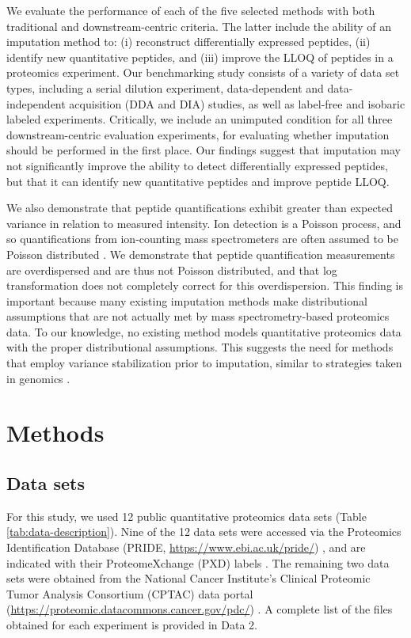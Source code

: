 \documentclass{article}
\begin{document}
We evaluate the performance of each of the five selected methods with both traditional and downstream-centric criteria. The latter include the ability of an imputation method to: (i) reconstruct differentially expressed peptides, (ii) identify new quantitative peptides, and (iii) improve the LLOQ of peptides in a proteomics experiment. Our benchmarking study consists of a variety of data set types, including a serial dilution experiment, data-dependent and data-independent acquisition (DDA and DIA) studies, as well as label-free and isobaric labeled experiments. Critically, we include an unimputed condition for all three downstream-centric evaluation experiments, for evaluating whether imputation should be performed in the first place. Our findings suggest that imputation may not significantly improve the ability to detect differentially expressed peptides, but that it can identify new quantitative peptides and improve peptide LLOQ.

We also demonstrate that peptide quantifications exhibit greater than expected variance in relation to measured intensity. Ion detection is a Poisson process, and so quantifications from ion-counting mass spectrometers are often assumed to be Poisson distributed \cite{ms-dist-derivation, stat-theory-lcms}. We demonstrate that peptide quantification measurements are overdispersed and are thus not Poisson distributed, and that log transformation does not completely correct for this overdispersion. This finding is important because many existing imputation methods make distributional assumptions that are not actually met by mass spectrometry-based proteomics data. To our knowledge, no existing method models quantitative proteomics data with the proper distributional assumptions. This suggests the need for methods that employ variance stabilization prior to imputation, similar to strategies taken in genomics \cite{variance-stable, ZINB, neg-binom-scRNAseq}.

\section{Methods}

\subsection{Data sets}

For this study, we used 12 public quantitative proteomics data sets (Table \ref{tab:data-description}). Nine of the 12 data sets were accessed via the Proteomics Identification Database (PRIDE, \url{https://www.ebi.ac.uk/pride/}) \cite{PRIDE}, and are indicated with their ProteomeXchange (PXD) labels \cite{ProteomeXchange}. The remaining two data sets were obtained from the National Cancer Institute's Clinical Proteomic Tumor Analysis Consortium (CPTAC) data portal (\url{https://proteomic.datacommons.cancer.gov/pdc/}) \cite{CPTAC}. A complete list of the files obtained for each experiment is provided in Data 2. 
\end{document}
